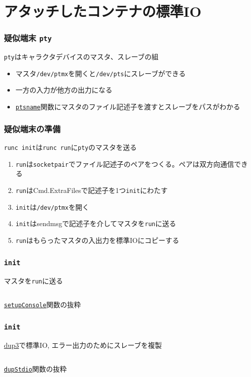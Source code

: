 \documentclass[unicode, 14pt, aspectratio=169]{beamer}
\begin{document}
\section{アタッチしたコンテナの標準IO}
\begin{frame}[t]
  \frametitle{疑似端末 \texttt{pty}}
  \texttt{pty}はキャラクタデバイスのマスタ、スレーブの組\supercite{pty}
  \begin{itemize}[leftmargin=0.8cm,label=$\circ$]
  \item マスタ\texttt{/dev/ptmx}を開くと\texttt{/dev/pts}にスレーブができる
  \item 一方の入力が他方の出力になる
  \item \href{https://man7.org/linux/man-pages/man3/ptsname.3.html}{\texttt{ptsname}}関数にマスタのファイル記述子を渡すとスレーブをパスがわかる
  \end{itemize}
\end{frame}
\begin{frame}[t]
  \frametitle{疑似端末の準備}
  \texttt{runc init}は\texttt{runc run}に\texttt{pty}のマスタを送る
  \begin{enumerate}[leftmargin=1.2cm]
  \item \texttt{run}は\texttt{socketpair}でファイル記述子のペアをつくる。ペアは双方向通信できる
  \item \texttt{run}はCmd.ExtraFilesで記述子を1つ\texttt{init}にわたす 
  \item \texttt{init}は\texttt{/dev/ptmx}を開く
  \item \texttt{init}はsendmsgで記述子を介してマスタを\texttt{run}に送る
  \item \texttt{run}はもらったマスタの入出力を標準IOにコピーする
  \end{enumerate}
\end{frame}
\begin{frame}[t]
  \frametitle{\texttt{init}}
  マスタを\texttt{run}に送る
  \begin{center}
    \inputminted{go}{code/tty_init.go}
    \href{https://github.com/opencontainers/runc/blob/7cb363254b69e10320360b63fb73e0ffb5da7bf2/libcontainer/init_linux.go\#L371}{\texttt{setupConsole}}関数の抜粋
  \end{center}
\end{frame}
\begin{frame}[t]
  \frametitle{\texttt{init}}
  \href{https://ja.manpages.org/dup3/2}{dup3}で標準IO, エラー出力のためにスレーブを複製
  \begin{center}
    \inputminted{go}{code/pty_init_dup.go}
    \href{https://github.com/opencontainers/runc/blob/7cb363254b69e10320360b63fb73e0ffb5da7bf2/libcontainer/console_linux.go\#L28}{\texttt{dupStdio}}関数の抜粋
  \end{center}
\end{frame}
\end{document}
